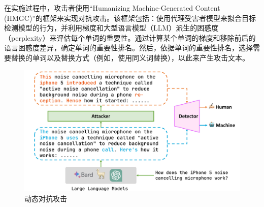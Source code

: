 \documentclass[a4paper]{report}
\begin{document}
在实施过程中，攻击者使用“Humanizing Machine-Generated Content (HMGC)”的框架来实现对抗攻击。该框架包括：使用代理受害者模型来拟合目标检测模型的行为，并利用梯度和大型语言模型（LLM）派生的困惑度（perplexity）来评估每个单词的重要性。通过计算某个单词的梯度和移除前后的语言困惑度差异，确定单词的重要性排名。然后，依据单词的重要性排名，选择需要替换的单词以及替换方式（例如，使用同义词替换），以此来产生攻击文本\cite{zhou2024humanizing}。
\begin{figure}[H]
	\centering
	\includegraphics[width=1\textwidth]{动态对抗攻击.pdf}
	\caption{动态对抗攻击}
	\label{fig:Pre-training & Fine-Tuning}
\end{figure}
\end{document}

